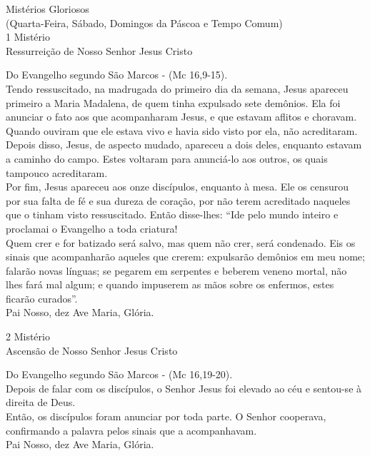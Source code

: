 \documentclass{book}
\begin{document}
\newpage
\begin{center}
    Mistérios Gloriosos \\ \textcolor{VioletRed2}{\scriptsize{(Quarta-Feira, Sábado, Domingos da Páscoa e Tempo Comum)}} \\
    \hfill{} \break{}
    1\textordmasculine{} Mistério \\ Ressurreição de Nosso Senhor Jesus Cristo
\end{center}
\begin{flushleft}
    Do Evangelho segundo São Marcos - (\textcolor{VioletRed2}{Mc 16,9-15}). \\
    \hfill{} \break{}
    Tendo ressuscitado, na madrugada do primeiro dia da semana, Jesus apareceu primeiro a Maria Madalena, de quem tinha expulsado sete demônios. Ela foi anunciar o fato aos que acompanharam Jesus, e que estavam aflitos e choravam. Quando ouviram que ele estava vivo e havia sido visto por ela, não acreditaram. Depois disso, Jesus, de aspecto mudado, apareceu a dois deles, enquanto estavam a caminho do campo. Estes voltaram para anunciá-lo aos outros, os quais tampouco acreditaram.
    \vspace{.2cm} \\
    Por fim, Jesus apareceu aos onze discípulos, enquanto à mesa. Ele os censurou por sua falta de fé e sua dureza de coração, por não terem acreditado naqueles que o tinham visto ressuscitado. Então disse-lhes: ``Ide pelo mundo inteiro e proclamai o Evangelho a toda criatura!
    \vspace{.2cm} \\
    Quem crer e for batizado será salvo, mas quem não crer, será condenado. Eis os sinais que acompanharão aqueles que crerem: expulsarão demônios em meu nome; falarão novas línguas; se pegarem em serpentes e beberem veneno mortal, não lhes fará mal algum; e quando impuserem as mãos sobre os enfermos, estes ficarão curados''. \\
    \hfill{} \break{}
    Pai Nosso, dez Ave Maria, Glória.
\end{flushleft}
\begin{center}
    2\textordmasculine{} Mistério \\ Ascensão de Nosso Senhor Jesus Cristo
\end{center}
\begin{flushleft}
    Do Evangelho segundo São Marcos - (\textcolor{VioletRed2}{Mc 16,19-20}). \\
    \hfill{} \break{}
    Depois de falar com os discípulos, o Senhor Jesus foi elevado ao céu e sentou-se à direita de Deus.
    \vspace{.2cm} \\
    Então, os discípulos foram anunciar por toda parte. O Senhor cooperava, confirmando a palavra pelos sinais que a acompanhavam. \\
    \hfill{} \break{}
    Pai Nosso, dez Ave Maria, Glória.
\end{flushleft}
\end{document}
